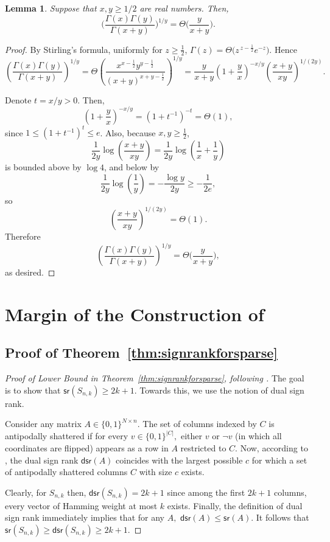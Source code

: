 \documentclass[preprint]{article}
\newtheorem{lemma}{Lemma}[]
\newcommand{\signrank}{\mathsf{sr}}
\newcommand{\dsignrank}{\mathsf{dsr}}
\newcommand{\ksparsen}{S_{n,k}}
\begin{document}
\begin{lemma}
Suppose that $x,y\ge 1/2$ are real numbers. Then,
$$
\Bigg(\frac{\Gamma(x)\Gamma(y)}{\Gamma(x+y)}\Bigg)^{1/y} = \Theta\Big(\frac{y}{x+y}\Big).
$$
\end{lemma}
\begin{proof}
By Stirling's formula, uniformly for \(z\ge \tfrac12\),
$
\Gamma(z)=\Theta\big( z^{\,z-\frac12}e^{-z}\big).
$
Hence
\[
\left(\frac{\Gamma(x)\Gamma(y)}{\Gamma(x+y)}\right)^{1/y}
=\Theta
\left(\frac{x^{x-\frac12}y^{y-\frac12}}{(x+y)^{x+y-\frac12}}\right)^{1/y}
=
\frac{y}{x+y}
\left(1+\frac{y}{x}\right)^{-x/y}
\left(\frac{x+y}{xy}\right)^{1/(2y)}.
\]

Denote \(t=x/y>0\). Then,
\[
\left(1+\frac{y}{x}\right)^{-x/y}=(1+t^{-1})^{-t}=\Theta(1),
\]
since \(1\le (1+t^{-1})^t\le e\). Also, because \(x,y\ge \tfrac12\),
\[
\frac1{2y}\log\!\left(\frac{x+y}{xy}\right)
=
\frac1{2y}\log\!\left(\frac1x+\frac1y\right)
\]
is bounded above by \(\log 4\), and below by
\[
\frac1{2y}\log\!\left(\frac1y\right)
=
-\frac{\log y}{2y}\ge -\frac1{2e},
\]
so
\[
\left(\frac{x+y}{xy}\right)^{1/(2y)}=\Theta(1).
\]
Therefore
\[
\left(\frac{\Gamma(x)\Gamma(y)}{\Gamma(x+y)}\right)^{1/y} = 
\Theta\Big( \frac{y}{x+y}\Big),\]
as desired.
\end{proof}

\section{Margin of the Construction of \texorpdfstring{\cite{AlonFranklRodl1985}}{Alon,Frankl,Rold}}
\label{sec:marginalgebraic}
\subsection{Proof of Theorem~\texorpdfstring{\ref{thm:signrankforsparse}}{Sign Rank Theorem}}
\label{appendix:signrank}
\begin{proof}[Proof of Lower Bound in Theorem~\ref{thm:signrankforsparse}, following \cite{alon2016sign}] The goal is to show that $\signrank(\ksparsen)\ge 2k+1.$ Towards this, we use the notion of dual sign rank. 

Consider any matrix $A\in \{0,1\}^{N\times n}.$ The set of columns indexed by $C$ is antipodally shattered if for every $v\in \{0,1\}^{|C|},$ either $v$ or $\neg v $ (in which all coordinates are flipped) appears as a row in $A$ restricted to $C.$ Now, according to \cite[Corollary 1.6]{alon2016sign}, the dual sign rank $\dsignrank(A)$ coincides with the largest possible $c$ for which a set of antipodally shattered columns $C$ with size $c$ exists. 

Clearly, for $\ksparsen$ then, $\dsignrank(\ksparsen) = 2k+1$ since among the first $2k+1$ columns, every vector of Hamming weight at most $k$ exists. Finally, the definition of dual sign rank immediately implies that for any $A,$ $\dsignrank(A)\le \signrank(A).$ It follows that $\signrank(\ksparsen)\ge \dsignrank(\ksparsen)\ge 2k+1.$ 
\end{proof}
\end{document}
